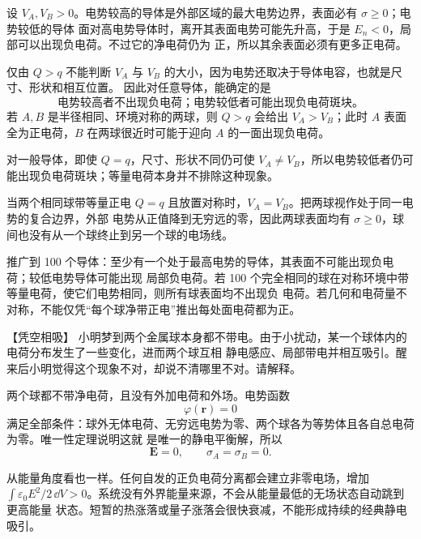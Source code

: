 {\begin{xesolution}
设 $V_A,V_B>0$。电势较高的导体是外部区域的最大电势边界，表面必有 $\sigma\ge0$；电势较低的导体
面对高电势导体时，离开其表面电势可能先升高，于是 $E_n<0$，局部可以出现负电荷。不过它的净电荷仍为
正，所以其余表面必须有更多正电荷。

仅由 $Q>q$ 不能判断 $V_A$ 与 $V_B$ 的大小，因为电势还取决于导体电容，也就是尺寸、形状和相互位置。
因此对任意导体，能确定的是
\[
  \boxed{\text{电势较高者不出现负电荷；电势较低者可能出现负电荷斑块。}}
\]
若 $A,B$ 是半径相同、环境对称的两球，则 $Q>q$ 会给出 $V_A>V_B$；此时 $A$ 表面全为正电荷，$B$
在两球很近时可能于迎向 $A$ 的一面出现负电荷。

对一般导体，即使 $Q=q$，尺寸、形状不同仍可使 $V_A\ne V_B$，所以电势较低者仍可能出现负电荷斑块；等量电荷本身并不排除这种现象。

当两个相同球带等量正电 $Q=q$ 且放置对称时，$V_A=V_B$。把两球视作处于同一电势的复合边界，外部
电势从正值降到无穷远的零，因此两球表面均有 $\sigma\ge0$，球间也没有从一个球终止到另一个球的电场线。

推广到 100 个导体：至少有一个处于最高电势的导体，其表面不可能出现负电荷；较低电势导体可能出现
局部负电荷。若 100 个完全相同的球在对称环境中带等量电荷，使它们电势相同，则所有球表面均不出现负
电荷。若几何和电荷量不对称，不能仅凭“每个球净带正电”推出每处面电荷都为正。
\end{xesolution}



\begin{origexamplebox}{【凭空相吸】}\label{ch20:ex:s34-3-3}
小明梦到两个金属球本身都不带电。由于小扰动，某一个球体内的电荷分布发生了一些变化，进而两个球互相
静电感应、局部带电并相互吸引。醒来后小明觉得这个现象不对，却说不清哪里不对。请解释。

\ThQNeutralConductors
\end{origexamplebox}\par\nopagebreak[4]

\begin{xesolution}
\ThANeutralConductors

两个球都不带净电荷，且没有外加电荷和外场。电势函数
\[
  \varphi(\boldsymbol r)=0
\]
满足全部条件：球外无体电荷、无穷远电势为零、两个球各为等势体且各自总电荷为零。唯一性定理说明这就
是唯一的静电平衡解，所以
\[
  \boxed{\boldsymbol E=0,\qquad \sigma_A=\sigma_B=0}.
\]

从能量角度看也一样。任何自发的正负电荷分离都会建立非零电场，增加
$\int\varepsilon_0E^2/2\,\dd V>0$。系统没有外界能量来源，不会从能量最低的无场状态自动跳到更高能量
状态。短暂的热涨落或量子涨落会很快衰减，不能形成持续的经典静电吸引。


\end{xesolution}}
